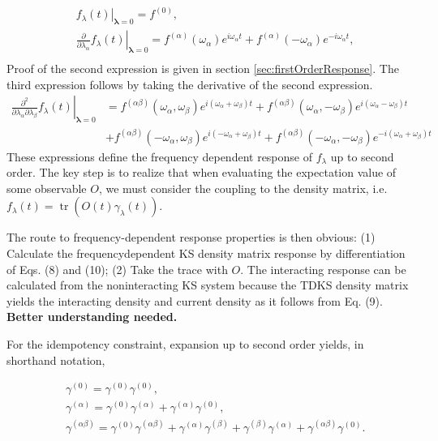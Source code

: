 \begin{align}
& \left.f_{\lambda}(t)\right|_{\boldsymbol{\lambda}=0}=f^{(0)},  \\
& \left.\frac{\partial}{\partial \lambda_{\alpha}} f_{\lambda}(t)\right|_{\boldsymbol{\lambda}=0}=f^{(\alpha)}\left(\omega_{\alpha}\right) e^{i \omega_{\alpha} t}+f^{(\alpha)}\left(-\omega_{\alpha}\right) e^{-i \omega_{\alpha} t},  \\
\end{align}
Proof of the second expression is given in section \ref{sec:firstOrderResponse}. The third expression follows by taking the derivative of the second expression.
\begin{align}
    \left.\frac{\partial^{2}}{\partial \lambda_{\alpha} \partial \lambda_{\beta}} f_{\lambda}(t)\right|_{\boldsymbol{\lambda}=0}&= f^{(\alpha \beta)}  \left(\omega_{\alpha}, \omega_{\beta}\right) e^{i\left(\omega_{\alpha}+\omega_{\beta}\right) t} + f^{(\alpha \beta)}  \left(\omega_{\alpha}, -\omega_{\beta}\right) e^{i\left(\omega_{\alpha}-\omega_{\beta}\right) t}\\
 &+ f^{(\alpha \beta)}  \left(-\omega_{\alpha}, \omega_{\beta}\right) e^{i\left(-\omega_{\alpha}+\omega_{\beta}\right) t} + f^{(\alpha \beta)}  \left(-\omega_{\alpha}, -\omega_{\beta}\right) e^{-i\left(\omega_{\alpha}+\omega_{\beta}\right) t}
\end{align}
These expressions define the frequency dependent response of $f_{\lambda}$ up to second order. The key step is to realize that when evaluating the expectation value of some observable $O$, we must consider the coupling to the density matrix, i.e. $f_{\lambda}(t)=\operatorname{tr}\left(O(t) \gamma_{\lambda}(t)\right)$.
 
The route to frequency-dependent response properties is then obvious: (1) Calculate the frequencydependent KS density matrix response by differentiation of Eqs. (8) and (10); (2) Take the trace with $O$. The interacting response can be calculated from the noninteracting KS system because the TDKS density matrix yields the interacting density and current density as it follows from Eq. (9). \textbf{Better understanding needed.}

For the idempotency constraint, expansion up to second order yields, in shorthand notation,


\begin{align*}
& \gamma^{(0)}=\gamma^{(0)} \gamma^{(0)},  \tag{16}\\
& \gamma^{(\alpha)}=\gamma^{(0)} \gamma^{(\alpha)}+\gamma^{(\alpha)} \gamma^{(0)},  \tag{17}\\
& \gamma^{(\alpha \beta)}=\gamma^{(0)} \gamma^{(\alpha \beta)}+\gamma^{(\alpha)} \gamma^{(\beta)}+\gamma^{(\beta)} \gamma^{(\alpha)}+\gamma^{(\alpha \beta)} \gamma^{(0)} . \tag{18}
\end{align*}


